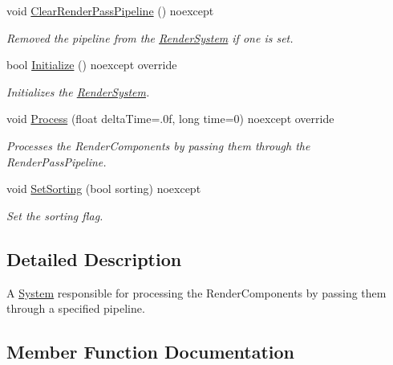 \begin{DoxyCompactItemize}
void \hyperlink{class_blade_1_1_render_system_a8f09fc8598972eacddd158fc14fc3cde}{Clear\+Render\+Pass\+Pipeline} () noexcept
\begin{DoxyCompactList}\small\item\em Removed the pipeline from the \hyperlink{class_blade_1_1_render_system}{Render\+System} if one is set. \end{DoxyCompactList}\item 
bool \hyperlink{class_blade_1_1_render_system_a476d3d55dcc9f65e8a88096aace6dcfc}{Initialize} () noexcept override
\begin{DoxyCompactList}\small\item\em Initializes the \hyperlink{class_blade_1_1_render_system}{Render\+System}. \end{DoxyCompactList}\item 
void \hyperlink{class_blade_1_1_render_system_a8edd0d0c9d5d54c395a03f98f6b16fb9}{Process} (float delta\+Time=.\+0f, long time=0) noexcept override
\begin{DoxyCompactList}\small\item\em Processes the Render\+Components by passing them through the Render\+Pass\+Pipeline. \end{DoxyCompactList}\item 
void \hyperlink{class_blade_1_1_render_system_a6bbc18b56812347c4960336f5d15effa}{Set\+Sorting} (bool sorting) noexcept
\begin{DoxyCompactList}\small\item\em Set the sorting flag. \end{DoxyCompactList}\end{DoxyCompactItemize}


\subsection{Detailed Description}
A \hyperlink{class_blade_1_1_system}{System} responsible for processing the Render\+Components by passing them through a specified pipeline. 

\subsection{Member Function Documentation}
\mbox{\label{class_blade_1_1_render_system_a476d3d55dcc9f65e8a88096aace6dcfc}} 
